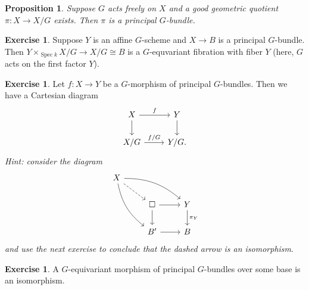\documentclass{amsart}
\newtheorem{prop}[thm]{Proposition}
\theoremstyle{definition}
\newtheorem{exer}[thm]{Exercise}
\theoremstyle{remark}
\theoremstyle{plain}
\theoremstyle{definition}
\theoremstyle{remark}
\newcommand{\1}{\mathbf{1}}
\newcommand{\2}{\mathbf{2}}
\newcommand{\3}{\mathbf{3}}
\DeclareMathOperator{\Spec}{Spec}
\begin{document}
\begin{prop}
    Suppose \(G\) acts freely on \(X\) and a good geometric quotient \(\pi \colon X \to X/G\) exists. Then \(\pi\) is a principal \(G\)-bundle.
\end{prop}

\begin{exer}
    Suppose \(Y\) is an affine \(G\)-scheme and \(X \to B\) is a principal \(G\)-bundle. Then \(Y \times_{\Spec k} X / G \to X / G \cong B\) is a \(G\)-equvariant fibration with fiber \(Y\) (here, \(G\) acts on the first factor \(Y\)).
\end{exer}

\begin{exer}
    Let \(f \colon X \to Y\) be a \(G\)-morphism of principal \(G\)-bundles. Then we have a Cartesian diagram
    \begin{equation*}
    \begin{tikzcd}
        X \ar{r}{f} \ar{d} & Y \ar{d} \\
        X/G \ar{r}{f/G} & Y/G.
    \end{tikzcd}
    \end{equation*}
    \textit{Hint: consider the diagram}
    \begin{equation*}
    \begin{tikzcd}
        X \ar[bend left=20]{drr} \ar[bend right=20]{ddr} \ar[dashrightarrow]{dr} \\
        & \square \ar{r} \ar{d} & Y \ar{d}{\pi_Y} \\
        & B' \ar{r} & B
    \end{tikzcd}
    \end{equation*}
    \textit{and use the next exercise to conclude that the dashed arrow is an isomorphism}.
\end{exer}

\begin{exer}
    A \(G\)-equivariant morphism of principal \(G\)-bundles over some base is an isomorphism.
\end{exer}
\end{document}
